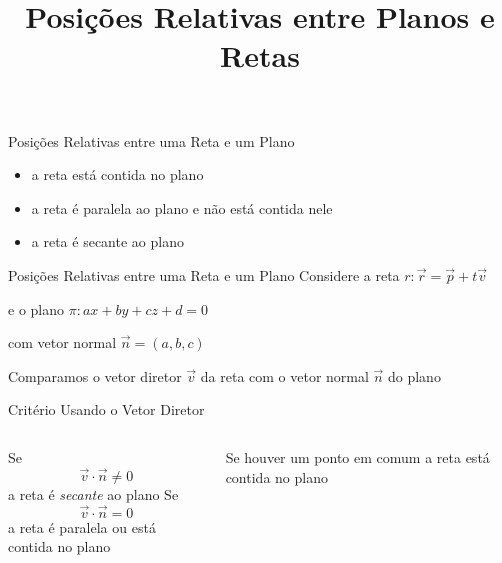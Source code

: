 \documentclass[fleqn,aspectratio=169,12pt]{beamer}
\title{Posições Relativas entre Planos e Retas}
\begin{document}
\addtitle

\begin{frame}{Posições Relativas entre uma Reta e um Plano}
  \begin{itemize}[<+->]
      \item a reta está contida no plano
      \item a reta é paralela ao plano e não está contida nele
      \item a reta é secante ao plano
  \end{itemize}
\end{frame}

\begin{frame}{Posições Relativas entre uma Reta e um Plano}
  Considere a reta
  \tabto{40mm}
  \(
    r\colon \vec{r} = \vec{p} + t\vec{v}
  \)

  \pause
  \medskip
  e o plano
  \tabto{40mm}
  \(
    \pi\colon ax + by + cz + d = 0
  \)

  \pause
  \smallskip
  com vetor normal
  \tabto{40mm}
  \(
    \vec{n} = (a, b, c)
  \)

  \pause
  \medskip
  Comparamos o vetor diretor $\vec{v}$ da reta
  \pause
  com o vetor normal $\vec{n}$ do plano
\end{frame}

\begin{frame}{Critério Usando o Vetor Diretor}
\begin{columns}[t]
  Se
  \[
    \vec{v}\cdot\vec{n} \neq 0
  \]
  \pause
  a reta é \emph{secante} ao plano
\pause
  Se
  \[
    \vec{v}\cdot\vec{n} = 0
  \]
  \pause
  a reta é paralela ou está contida no plano

  \bigskip
  \bigskip
  \pause
  Se houver um ponto em comum a reta está contida no plano
\end{columns}
\end{frame}




\end{document}
